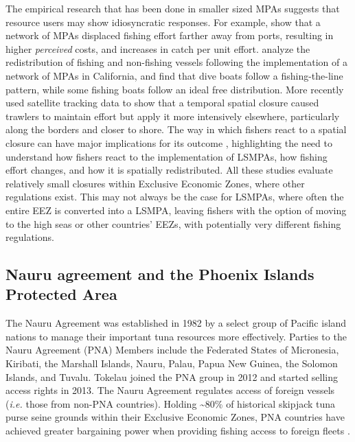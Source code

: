 \documentclass[9p,twocolumn,twoside,lineno]{pnas-new}
\begin{document}
The empirical research that has been done in smaller sized MPAs
suggests that resource users may show idiosyncratic responses. For
example, \cite{stevenson_2013} show that a network of MPAs displaced
fishing effort farther away from ports, resulting in higher
\emph{perceived} costs, and increases in catch per unit effort.
\cite{cabral_2017} analyze the redistribution of fishing and
non-fishing vessels following the implementation of a network of MPAs in
California, and find that dive boats follow a
fishing-the-line pattern, while some fishing boats follow an ideal free
distribution. More recently \cite{elahi_2018} used satellite tracking
data to show that a temporal spatial closure caused trawlers to maintain
effort but apply it more intensively elsewhere, particularly along the
borders and closer to shore. The way in which fishers react to a spatial
closure can have major implications for its outcome
\citep{smith_2003,hilborn_2006}, highlighting the need to understand how
fishers react to the implementation of LSMPAs, how fishing effort
changes, and how it is spatially redistributed. All these studies evaluate relatively small closures within Exclusive Economic Zones, where other regulations exist.
This may not always be the case for LSMPAs, where often the entire EEZ
is converted into a LSMPA, leaving fishers with the option of moving to
the high seas or other countries' EEZs, with potentially very different fishing regulations.

\subsection{Nauru agreement and the Phoenix Islands Protected Area}
\label{nauru-agreement-and-the-phoenix-island-protected-area}

The Nauru Agreement was established in 1982 by a select group of Pacific
island nations to manage their important tuna resources more effectively.
Parties to the Nauru Agreement (PNA) Members
include the Federated States of Micronesia, Kiribati, the Marshall Islands,
Nauru, Palau, Papua New Guinea, the Solomon Islands, and Tuvalu.
Tokelau joined the PNA group in 2012 and started selling access rights in 2013. The Nauru
Agreement regulates access of foreign vessels (\emph{i.e.} those from
non-PNA countries). Holding \textasciitilde{}80\% of historical
skipjack tuna purse seine grounds within their Exclusive Economic Zones, PNA
countries have achieved greater bargaining power when providing fishing access to foreign
fleets \cite{havice_2010}.
\end{document}

